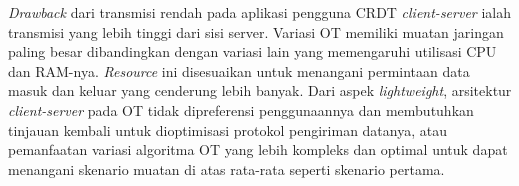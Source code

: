 \textit{Drawback} dari transmisi rendah pada aplikasi pengguna CRDT \textit{client-server} ialah transmisi yang lebih tinggi dari sisi server. Variasi OT memiliki muatan jaringan paling besar dibandingkan dengan variasi lain yang memengaruhi utilisasi CPU dan RAM-nya. \textit{Resource} ini disesuaikan untuk menangani permintaan data masuk dan keluar yang cenderung lebih banyak. Dari aspek \textit{lightweight}, arsitektur \textit{client-server} pada OT tidak dipreferensi penggunaannya dan membutuhkan tinjauan kembali untuk dioptimisasi protokol pengiriman datanya, atau pemanfaatan variasi algoritma OT yang lebih kompleks dan optimal untuk dapat menangani skenario muatan di atas rata-rata seperti skenario pertama.
